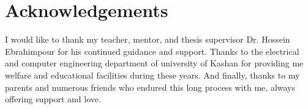 \chapter{Acknowledgements}
\label{sec:acknowledgements}
\let\cleardoublepage\clearpage


\vspace{3cm}

\begin{adjustwidth}{70pt}{70pt}

I would like to thank my teacher, mentor, and thesis supervisor Dr. Hossein Ebrahimpour for his continued guidance and support.
Thanks to the electrical and computer engineering department of university of Kashan for providing me welfare and educational facilities during these years.
And finally, thanks to my parents and numerous friends who endured this long process with me, always offering support and love. 

\end{adjustwidth}